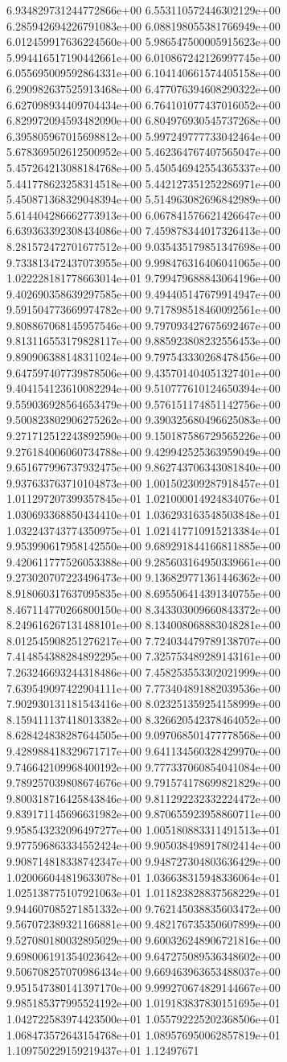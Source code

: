 	6.934829731244772866e+00	6.553110572446302129e+00	6.285942694226791083e+00	6.088198055381766949e+00	6.012459917636224560e+00	5.986547500005915623e+00	5.994416517190442661e+00	6.010867242126997745e+00	6.055695009592864331e+00	6.104140661574405158e+00	6.290982637525913468e+00	6.477076394608290322e+00	6.627098934409704434e+00	6.764101077437016052e+00	6.829972094593482090e+00	6.804976930545737268e+00	6.395805967015698812e+00	5.997249777733042464e+00	5.678369502612500952e+00	5.462364767407565047e+00	5.457264213088184768e+00	5.450546942554365337e+00	5.441778623258314518e+00	5.442127351252286971e+00	5.450871368329048394e+00	5.514963082696842989e+00	5.614404286662773913e+00	6.067841576621426647e+00	6.639363392308434086e+00	7.459878344017326413e+00	8.281572472701677512e+00	9.035435179851347698e+00	9.733813472437073955e+00	9.998476316406041065e+00	1.022228181778663014e+01	9.799479688843064196e+00	9.402690358639297585e+00	9.494405147679914947e+00	9.591504773669974782e+00	9.717898518460092561e+00	9.808867068145957546e+00	9.797093427675692467e+00	9.813116553179828117e+00	9.885923808232556453e+00	9.890906388148311024e+00	9.797543330268478456e+00	9.647597407739878506e+00	9.435701404051327401e+00	9.404154123610082294e+00	9.510777610124650394e+00	9.559036928564653479e+00	9.576151174851142756e+00	9.500823802906275262e+00	9.390325680496625083e+00	9.271712512243892590e+00	9.150187586729565226e+00	9.276184006060734788e+00	9.429942525363959049e+00	9.651677996737932475e+00	9.862743706343081840e+00	9.937633763710104873e+00	1.001502309287918457e+01	1.011297207399357845e+01	1.021000014924834076e+01	1.030693368850434410e+01	1.036293163548503848e+01	1.032243743774350975e+01	1.021417710915213384e+01	9.953990617958142550e+00	9.689291844166811885e+00	9.420611777526053388e+00	9.285603164950339661e+00	9.273020707223496473e+00	9.136829771361446362e+00	8.918060317637095835e+00	8.695506414391340755e+00	8.467114770266800150e+00	8.343303009660843372e+00	8.249616267131488101e+00	8.134008068883048281e+00	8.012545908251276217e+00	7.724034479789138707e+00	7.414854388284892295e+00	7.325753489289143161e+00	7.263246693244318486e+00	7.458253553302021999e+00	7.639549097422904111e+00	7.773404891882039536e+00	7.902930131181543416e+00	8.023251359254158999e+00	8.159411137418013382e+00	8.326620542378464052e+00	8.628424838287644505e+00	9.097068501477778568e+00	9.428988418329671717e+00	9.641134560328429970e+00	9.746642109968400192e+00	9.777337060854041084e+00	9.789257039808674676e+00	9.791574178699821829e+00	9.800318716425843846e+00	9.811292232332224472e+00	9.839171145696631982e+00	9.870655923958860711e+00	9.958543232096497277e+00	1.005180883311491513e+01	9.977596863334552424e+00	9.905038498917802414e+00	9.908714818338742347e+00	9.948727304803636429e+00	1.020066044819633078e+01	1.036638315948336064e+01	1.025138775107921063e+01	1.011823828837568229e+01	9.944607085271851332e+00	9.762145038835603472e+00	9.567072389321166881e+00	9.482176735350607899e+00	9.527080180032895029e+00	9.600326248906721816e+00	9.698006191354023642e+00	9.647275089536348602e+00	9.506708257070986434e+00	9.669463963653488037e+00	9.951547380141397170e+00	9.999270674829144667e+00	9.985185377995524192e+00	1.019183837830151695e+01	1.042722583974423500e+01	1.055792225202368506e+01	1.068473572643154768e+01	1.089576950062857819e+01	1.109750229159219437e+01	1.12497671